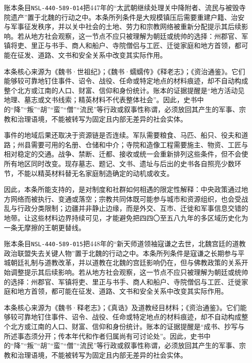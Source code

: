 账本条目\texttt{NSL-440-589-014}把447年的“太武朝继续处理关中降附者、流民与被毁寺院遗产”置于北魏的行动之中。本条所列条件是大规模镇压后需要重建户籍、治安与军事征发秩序，并以关中社会的土地、劳力和宗教网络被重新分配提示其后续影响。若从地方社会观察，这一节点不应只被理解为朝廷或统帅的选择：州郡官、军镇将吏、里正与书手、商人和船户、寺院僧侣与工匠、迁徙家庭和地方首领，都可能在征发、道路、文书和安全关系中改变其实际作用。

本条核心来源为《魏书·世祖纪》；《魏书·蠕蠕传》《释老志》；《资治通鉴》。它们能够较可靠地钉住事件、诏令、战役、任命或特定地点的材料痕迹，却不自动构成整个北方或江南的人口、财富、信仰和身份统计。账本的证据提醒是“地方活动见地理、墓志或文书线索；精英材料不代表整体社会”。因此，史书中的“降”“叛”“胡”“蛮”“僧”“流民”等行政或叙事性称谓，必须放回其产生的军事、宗教和治理语境，不能被转写为固定且内部无差异的社会实体。

事件的地域后果还取决于资源链是否连续。军队需要粮食、马匹、船只、役夫和道路；州县需要可用的名册、仓储和中介；寺院和造像工程需要施主、物资、工匠与相对稳定的交通。战争、禁断、迁都、接收或统一会重新排列这些条件，但不会使所有地区同时改变。现存墓志、题记、文书、遗址与后出的史书各自照亮少数环节，不能以精英材料替无名家庭制造确定的动机或收支。

因此，本条所能支持的，是对制度和社群如何相遇的限定性解释：中央政策通过地方网络而被执行、变通或落空；宗教共同体既可能参与城市和资源组织，也会受战乱与行政分类限制；边疆并非静止边缘，而是外交、互市、迁徙和军事信息交错的地带。让这些材料边界持续可见，才能避免把四四〇至五八九年的多区域历史化为一条无摩擦的王朝更替线。

账本条目\texttt{NSL-440-589-015}把448年的“新天师道领袖寇谦之去世，北魏宫廷的道教政治联盟失去关键人物”置于北魏的行动之中。本条所列条件是寇谦之长期参与平城朝廷礼制与道教改革，并以道教在北魏的宫廷影响仍在，但与佛教政策的关系开始调整提示其后续影响。若从地方社会观察，这一节点不应只被理解为朝廷或统帅的选择：州郡官、军镇将吏、里正与书手、商人和船户、寺院僧侣与工匠、迁徙家庭和地方首领，都可能在征发、道路、文书和安全关系中改变其实际作用。

本条核心来源为《魏书·释老志》；《真诰》及道教经目材料；《资治通鉴》。它们能够较可靠地钉住事件、诏令、战役、任命或特定地点的材料痕迹，却不自动构成整个北方或江南的人口、财富、信仰和身份统计。账本的证据提醒是“成书、抄写与所述事态须分开；传本年代和作者归属尚有可讨论处”。因此，史书中的“降”“叛”“胡”“蛮”“僧”“流民”等行政或叙事性称谓，必须放回其产生的军事、宗教和治理语境，不能被转写为固定且内部无差异的社会实体。

